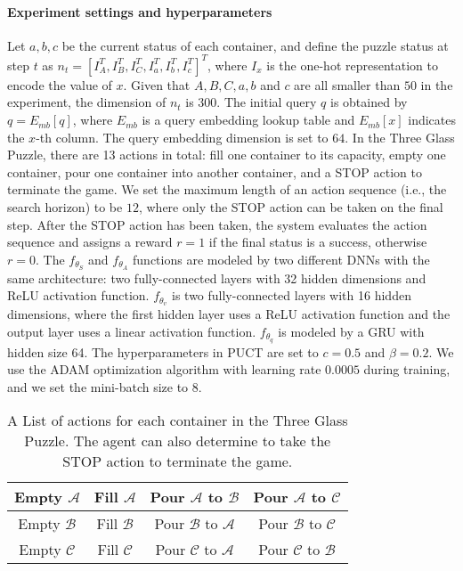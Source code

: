 \documentclass{article}
\begin{document}
\paragraph{Experiment settings and hyperparameters}
Let $a, b, c$ be the current status of each container, and define the puzzle status at step $t$ as $n_t = [I_A^T, I_B^T, I_C^T, I_a^T, I_b^T, I_c^T]^T$, where $I_{x}$ is the one-hot representation to encode the value of $x$. 
Given that $A, B, C, a, b$ and $c$ are all smaller than $50$ in the experiment, the dimension of $n_t$ is 300. 
The initial query $q$ is obtained by $q = {E_{mb}}[q]$, where ${E_{mb}}$ is a query embedding lookup table and ${E_{mb}}[x]$ indicates the $x$-th column.
The query embedding dimension is set to $64$.
In the Three Glass Puzzle, there are 13 actions in total: fill one container to its capacity, empty one container, pour one container into another container, and a STOP action to terminate the game. 
We set the maximum length of an action sequence (i.e., the search horizon) to be $12$, where only the STOP action can be taken on the final step.
After the STOP action has been taken, the system evaluates the action sequence and assigns a reward $r = 1$ if the final status is a success, otherwise $r = 0$. The $f_{{\theta}_{S}}$ and $f_{{\theta}_{A}}$ functions are modeled by two different DNNs with the same architecture: two fully-connected layers with 32 hidden dimensions and ReLU activation function.
$f_{{\theta}_{v}}$ is two fully-connected layers with 16 hidden dimensions, where the first hidden layer uses a ReLU activation function and the output layer uses a linear activation function. 
$f_{{\theta}_{q}}$ is modeled by a GRU with hidden size 64.
The hyperparameters in PUCT are set to $c=0.5$ and $\beta=0.2$. We use the ADAM optimization algorithm with learning rate $0.0005$ during training, and we set the mini-batch size to $8$.


\begin{table}[t]
	\centering
	{\caption{A List of actions for each container in the Three Glass Puzzle. The agent can also determine to take the STOP action to terminate the game.}
		\label{tab:puzzle_actions}
		\begin{tabular}{|c|c|c|c|}
			\hline
			 Empty $\mathcal{A}$ & Fill $\mathcal{A}$ & Pour $\mathcal{A}$ to $\mathcal{B}$  & Pour $\mathcal{A}$ to $\mathcal{C}$ \\
			 \hline
			 Empty $\mathcal{B}$ & Fill $\mathcal{B}$ & Pour $\mathcal{B}$ to $\mathcal{A}$  & Pour $\mathcal{B}$ to $\mathcal{C}$ \\
			 \hline
			 Empty $\mathcal{C}$ & Fill $\mathcal{C}$ & Pour $\mathcal{C}$ to $\mathcal{A}$  & Pour $\mathcal{C}$ to $\mathcal{B}$ \\
			\hline
		\end{tabular}
	}
\end{table}
\end{document}
